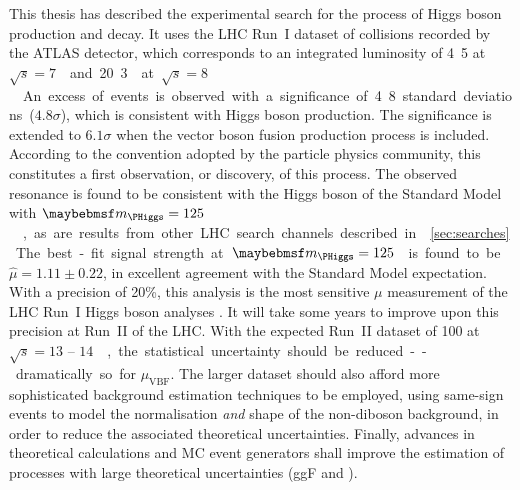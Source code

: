 
This thesis has described the experimental search for the \ggHWWlvlv process of Higgs boson 
production and decay. It uses the LHC Run~I dataset of \pp collisions recorded by the ATLAS 
detector, which corresponds to an integrated luminosity of \unit{4.5}{\invfb} at 
\unit{$\sqrt{s} = 7$}{\TeV} and \unit{20.3}{\invfb} at \unit{$\sqrt{s} = 8$}{\TeV}. 
An excess of events is observed with a significance of 4.8 standard deviations ($4.8\sigma$), 
which is consistent with Higgs boson production. The significance is extended to $6.1\sigma$ 
when the vector boson fusion production process is included. According to the convention 
adopted by the particle physics community, this constitutes a first observation, or 
discovery, of this process. The observed resonance is found to be consistent with the Higgs 
boson of the Standard Model with \unit{$\mH = 125$}{\GeV}, as are results from other LHC 
search channels described in \Section~\ref{sec:searches}.

The best-fit signal strength at \unit{$\mH = 125$}{\GeV} is found to be 
$\hat{\mu} = 1.11 \pm 0.22$, in excellent agreement with the Standard Model expectation. With 
a precision of 20\%, this \HWW analysis is the most sensitive $\mu$ measurement of the LHC 
Run~I Higgs boson analyses \cite{ATLAS:Hgg:RunI,ATLAS:HZZ:RunI,CMS:Hgamgam,CMS:HZZ,CMS:HWW}. 
It will take some years to improve upon this precision at Run~II of the LHC. With the 
expected Run~II dataset of \unit{100}{\invfb} at \unit{$\sqrt{s} = 13\text{ -- }14$}{\TeV}, 
the statistical uncertainty should be reduced -- dramatically so for $\mu_{\text{VBF}}$. 
The larger dataset should also afford more sophisticated background estimation techniques to 
be employed, \eg using same-sign events to model the normalisation \textit{and} shape of the 
non-\WW diboson background, in order to reduce the associated theoretical uncertainties. 
Finally, advances in theoretical calculations and MC event generators shall improve the 
estimation of processes with large theoretical uncertainties (\eg ggF and \WW).
